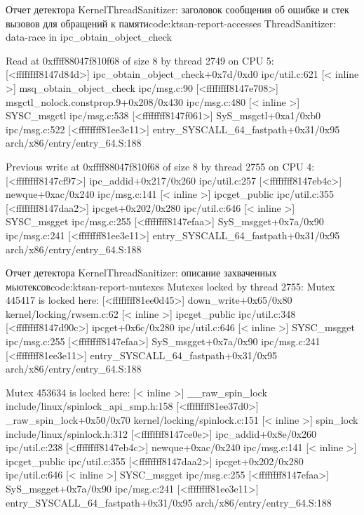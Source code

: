 \begin{listing}{Отчет детектора KernelThreadSanitizer: заголовок сообщения об ошибке и стек вызовов для обращений к памяти}{code:ktsan-report-accesses}
ThreadSanitizer: data-race in ipc_obtain_object_check

Read at 0xffff88047f810f68 of size 8 by thread 2749 on CPU 5:
 [<ffffffff8147d84d>] ipc_obtain_object_check+0x7d/0xd0 ipc/util.c:621
 [<     inline     >] msq_obtain_object_check ipc/msg.c:90
 [<ffffffff8147e708>] msgctl_nolock.constprop.9+0x208/0x430 ipc/msg.c:480
 [<     inline     >] SYSC_msgctl ipc/msg.c:538
 [<ffffffff8147f061>] SyS_msgctl+0xa1/0xb0 ipc/msg.c:522
 [<ffffffff81ee3e11>] entry_SYSCALL_64_fastpath+0x31/0x95 arch/x86/entry/entry_64.S:188

Previous write at 0xffff88047f810f68 of size 8 by thread 2755 on CPU 4:
 [<ffffffff8147cf97>] ipc_addid+0x217/0x260 ipc/util.c:257
 [<ffffffff8147eb4c>] newque+0xac/0x240 ipc/msg.c:141
 [<     inline     >] ipcget_public ipc/util.c:355
 [<ffffffff8147daa2>] ipcget+0x202/0x280 ipc/util.c:646
 [<     inline     >] SYSC_msgget ipc/msg.c:255
 [<ffffffff8147efaa>] SyS_msgget+0x7a/0x90 ipc/msg.c:241
 [<ffffffff81ee3e11>] entry_SYSCALL_64_fastpath+0x31/0x95 arch/x86/entry/entry_64.S:188
\end{listing}

\begin{listing}{Отчет детектора KernelThreadSanitizer: описание захваченных мьютексов}{code:ktsan-report-mutexes}
Mutexes locked by thread 2755:
Mutex 445417 is locked here:
 [<ffffffff81ee0d45>] down_write+0x65/0x80 kernel/locking/rwsem.c:62
 [<     inline     >] ipcget_public ipc/util.c:348
 [<ffffffff8147d90c>] ipcget+0x6c/0x280 ipc/util.c:646
 [<     inline     >] SYSC_msgget ipc/msg.c:255
 [<ffffffff8147efaa>] SyS_msgget+0x7a/0x90 ipc/msg.c:241
 [<ffffffff81ee3e11>] entry_SYSCALL_64_fastpath+0x31/0x95 arch/x86/entry/entry_64.S:188

Mutex 453634 is locked here:
 [<     inline     >] __raw_spin_lock include/linux/spinlock_api_smp.h:158
 [<ffffffff81ee37d0>] _raw_spin_lock+0x50/0x70 kernel/locking/spinlock.c:151
 [<     inline     >] spin_lock include/linux/spinlock.h:312
 [<ffffffff8147ce0e>] ipc_addid+0x8e/0x260 ipc/util.c:238
 [<ffffffff8147eb4c>] newque+0xac/0x240 ipc/msg.c:141
 [<     inline     >] ipcget_public ipc/util.c:355
 [<ffffffff8147daa2>] ipcget+0x202/0x280 ipc/util.c:646
 [<     inline     >] SYSC_msgget ipc/msg.c:255
 [<ffffffff8147efaa>] SyS_msgget+0x7a/0x90 ipc/msg.c:241
 [<ffffffff81ee3e11>] entry_SYSCALL_64_fastpath+0x31/0x95 arch/x86/entry/entry_64.S:188
\end{listing}

